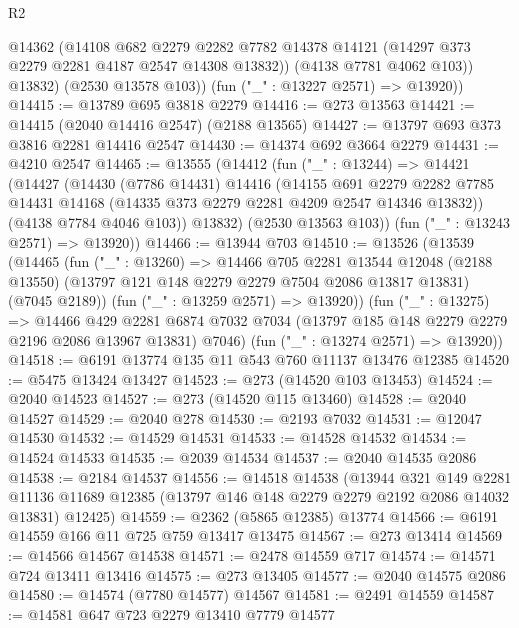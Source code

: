 \begin{lexlean}{R2}
\begin{coremodule}
            @14362
            (@14108
              @682
              @2279
              @2282
              @7782
              @14378
              @14121
              (@14297 @373 @2279 @2281 @4187 @2547 @14308 @13832))
            (@4138 @7781 @4062 @103))
          @13832)
        (@2530 @13578 @103))
      (fun ("_" : @13227 @2571) => @13920))
@14415 := @13789 @695 @3818 @2279
@14416 := @273 @13563
@14421 := @14415 (@2040 @14416 @2547) (@2188 @13565)
@14427 := @13797 @693 @373 @3816 @2281 @14416 @2547
@14430 := @14374 @692 @3664 @2279
@14431 := @4210 @2547
@14465 := @13555
    (@14412
      (fun ("_" : @13244) =>
      @14421
        (@14427
          (@14430
            (@7786 @14431)
            @14416
            (@14155
              @691
              @2279
              @2282
              @7785
              @14431
              @14168
              (@14335 @373 @2279 @2281 @4209 @2547 @14346 @13832))
            (@4138 @7784 @4046 @103))
          @13832)
        (@2530 @13563 @103))
      (fun ("_" : @13243 @2571) => @13920))
@14466 := @13944 @703
@14510 := @13526
    (@13539
      (@14465
        (fun ("_" : @13260) =>
        @14466
          @705
          @2281
          @13544
          @12048
          (@2188 @13550)
          (@13797 @121 @148 @2279 @2279 @7504 @2086 @13817 @13831)
          (@7045 @2189))
        (fun ("_" : @13259 @2571) => @13920))
      (fun ("_" : @13275) =>
      @14466
        @429
        @2281
        @6874
        @7032
        @7034
        (@13797 @185 @148 @2279 @2279 @2196 @2086 @13967 @13831)
        @7046)
      (fun ("_" : @13274 @2571) => @13920))
@14518 := @6191 @13774 @135 @11 @543 @760 @11137 @13476 @12385
@14520 := @5475 @13424 @13427
@14523 := @273 (@14520 @103 @13453)
@14524 := @2040 @14523
@14527 := @273 (@14520 @115 @13460)
@14528 := @2040 @14527
@14529 := @2040 @278
@14530 := @2193 @7032
@14531 := @12047 @14530
@14532 := @14529 @14531
@14533 := @14528 @14532
@14534 := @14524 @14533
@14535 := @2039 @14534
@14537 := @2040 @14535 @2086
@14538 := @2184 @14537
@14556 := @14518
    @14538
    (@13944
      @321
      @149
      @2281
      @11136
      @11689
      @12385
      (@13797 @146 @148 @2279 @2279 @2192 @2086 @14032 @13831)
      @12425)
@14559 := @2362 (@5865 @12385) @13774
@14566 := @6191 @14559 @166 @11 @725 @759 @13417 @13475
@14567 := @273 @13414
@14569 := @14566 @14567 @14538
@14571 := @2478 @14559 @717
@14574 := @14571 @724 @13411 @13416
@14575 := @273 @13405
@14577 := @2040 @14575 @2086
@14580 := @14574 (@7780 @14577) @14567
@14581 := @2491 @14559
@14587 := @14581 @647 @723 @2279 @13410 @7779 @14577

\end{coremodule}
\end{lexlean}

